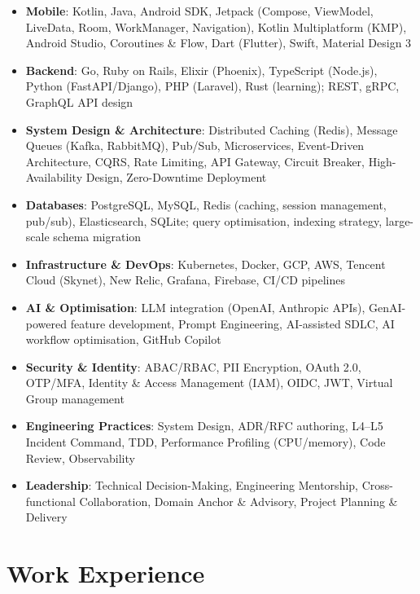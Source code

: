 \documentclass[10pt]{article}
\begin{document}
\begin{itemize}
\item \textbf{Mobile}: Kotlin, Java, Android SDK, Jetpack (Compose, ViewModel, LiveData, Room, WorkManager, Navigation), Kotlin Multiplatform (KMP), Android Studio, Coroutines \& Flow, Dart (Flutter), Swift, Material Design 3
\item \textbf{Backend}: Go, Ruby on Rails, Elixir (Phoenix), TypeScript (Node.js), Python (FastAPI/Django), PHP (Laravel), Rust (learning); REST, gRPC, GraphQL API design
\item \textbf{System Design \& Architecture}: Distributed Caching (Redis), Message Queues (Kafka, RabbitMQ), Pub/Sub, Microservices, Event-Driven Architecture, CQRS, Rate Limiting, API Gateway, Circuit Breaker, High-Availability Design, Zero-Downtime Deployment
\item \textbf{Databases}: PostgreSQL, MySQL, Redis (caching, session management, pub/sub), Elasticsearch, SQLite; query optimisation, indexing strategy, large-scale schema migration
\item \textbf{Infrastructure \& DevOps}: Kubernetes, Docker, GCP, AWS, Tencent Cloud (Skynet), New Relic, Grafana, Firebase, CI/CD pipelines
\item \textbf{AI \& Optimisation}: LLM integration (OpenAI, Anthropic APIs), GenAI-powered feature development, Prompt Engineering, AI-assisted SDLC, AI workflow optimisation, GitHub Copilot
\item \textbf{Security \& Identity}: ABAC/RBAC, PII Encryption, OAuth 2.0, OTP/MFA, Identity \& Access Management (IAM), OIDC, JWT, Virtual Group management
\item \textbf{Engineering Practices}: System Design, ADR/RFC authoring, L4--L5 Incident Command, TDD, Performance Profiling (CPU/memory), Code Review, Observability
\item \textbf{Leadership}: Technical Decision-Making, Engineering Mentorship, Cross-functional Collaboration, Domain Anchor \& Advisory, Project Planning \& Delivery
\end{itemize}

\section*{Work Experience}
\end{document}
